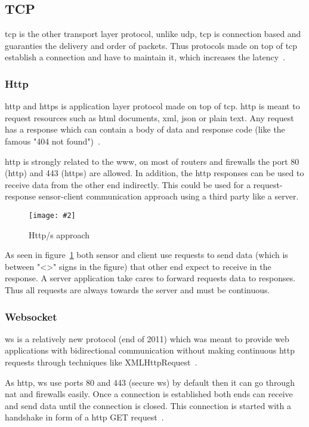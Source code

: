 \documentclass[hidelinks,11pt,a4paper,oneside,article]{memoir}
\newcommand{\putimage}[3][10] %
{
\begin{figure}[h]
	\centering
	\captionsetup{justification=centering}
	\texttt{[image: \#2]}
	\caption{#3}
	\label{fig:#2}
\end{figure}
}
\begin{document}
\subsection{TCP}
\gls{tcp} is the other transport layer protocol, unlike \gls{udp}, \gls{tcp} is connection based and guaranties the delivery and order of packets. Thus protocols made on top of \gls{tcp} establish a connection and have to maintain it, which increases the latency~\cite[19]{tcpip}.

\subsubsection{Http}\label{sec:http}
\gls{http} and \gls{https} is application layer protocol made on top of \gls{tcp}. \gls{http} is meant to request resources such as \gls{html} documents, \gls{xml}, \gls{json} or plain text. Any request has a response which can contain a body of data and response code (like the famous "404 not found")~\cite{http-rfc}.

\gls{http} is strongly related to the www, on most of routers and firewalls the port 80 (\gls{http}) and 443 (\gls{https}) are allowed. In addition, the \gls{http} responses can be used to receive data from the other end indirectly. This could be used for a request-response sensor-client communication approach using a third party like a server.

\putimage[14]{http-approach}{Http/s approach}

As seen in figure~\ref{fig:http-approach} both sensor and client use requests to send data (which is between "<>" signs in the figure) that other end expect to receive in the response. A server application take cares to forward requests data to responses. Thus all requests are always towards the server and must be continuous.

\subsubsection{Websocket}
\gls{ws} is a relatively new protocol (end of 2011) which was meant to provide web applications with bidirectional communication without making continuous \gls{http} requests through techniques like XMLHttpRequest~\cite[4]{rfc6455}.

As \gls{http}, \gls{ws} use ports 80 and 443 (secure \gls{ws}) by default then it can go through \gls{nat} and firewalls easily. Once a connection is established both ends can receive and send data until the connection is closed. This connection is started with a handshake in form of a \gls{http} GET request~\cite[6]{rfc6455}. 
\end{document}
